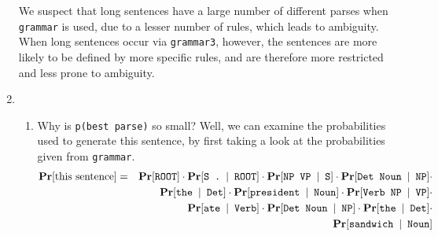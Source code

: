 \documentclass[11pt]{article}
\newcommand{\prob}[1]{\ensuremath{\text{{\bf Pr}$\left[#1\right]$}}}
\newcommand{\code}[1]{\texttt{#1}}
\begin{document}
\begin{enumerate}
	We suspect that long sentences have a large number of different parses when \code{grammar} is used, due to a lesser number of rules, which leads to ambiguity. When long sentences occur via \code{grammar3}, however, the sentences are more likely to be defined by more specific rules, and are therefore more restricted and less prone to ambiguity.
\item
	\begin{enumerate}[label=(\roman*)]
	\item
		Why is \code{p(best parse)} so small? Well, we can examine the probabilities used to generate this sentence, by first taking a look at the probabilities given from \code{grammar}.
		\begin{eqnarray*}
			\prob{\text{this sentence}} &=&  \prob{\code{ROOT}} \cdot \prob{\code{S . } | \code{ ROOT}} \cdot \prob{\code{NP VP } | \code{ S}} \cdot \prob{\code{Det Noun } | \code{ NP}} \cdot \\
			&& \prob{\code{the } | \code{ Det}} \cdot \prob{\code{president } | \code{ Noun}} \cdot \prob{\code{Verb NP } | \code{ VP}} \cdot \\
			&& \prob{\code{ate } | \code{ Verb}} \cdot \prob{\code{Det Noun } | \code{ NP}} \cdot \prob{\code{the } | \code{ Det}} \cdot \\
			&& \prob{\code{sandwich } | \code{ Noun}}
		\end{eqnarray*}
		
		\newpage
		

\end{enumerate}
\end{enumerate}
\end{document}
